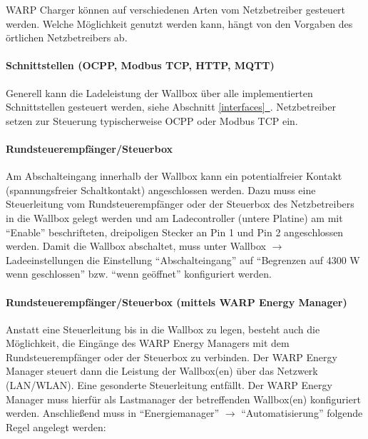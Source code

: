 \documentclass[a4paper,10pt]{article}
\newcommand*{\fullref}[1]{Abschnitt \hyperref[{#1}]{\ref*{#1}~\nameref*{#1}}}
\begin{document}
\begin{multicols*}{2}
    WARP Charger können auf verschiedenen Arten vom Netzbetreiber gesteuert werden.
    Welche Möglichkeit genutzt werden kann, hängt von den Vorgaben des örtlichen Netzbetreibers ab.

    \vspace{-0.3cm}
    \paragraph*{Schnittstellen (OCPP, Modbus TCP, HTTP, MQTT)}
    Generell kann die Ladeleistung der Wallbox über alle implementierten Schnittstellen gesteuert werden, siehe \fullref{interfaces}.
    Netzbetreiber setzen zur Steuerung typischerweise OCPP oder Modbus TCP ein.

    \vspace{-0.3cm}
    \paragraph*{Rundsteuerempfänger/Steuerbox}
    Am Abschalteingang innerhalb der Wallbox kann ein potentialfreier Kontakt (spannungsfreier Schaltkontakt)
    angeschlossen werden. Dazu muss eine Steuerleitung vom Rundsteuerempfänger
    oder der Steuerbox des Netzbetreibers in die Wallbox gelegt werden und am Ladecontroller (untere Platine)
    am mit \enquote{Enable} beschrifteten, dreipoligen Stecker an Pin 1 und Pin 2 angeschlossen werden.
    Damit die Wallbox abschaltet, muss unter Wallbox $\rightarrow$ Ladeeinstellungen die Einstellung \enquote{Abschalteingang} auf \enquote{Begrenzen auf 4300 W wenn geschlossen} bzw. \enquote{wenn geöffnet} konfiguriert werden.

    \vspace{-0.3cm}
    \paragraph*{Rundsteuerempfänger/Steuerbox (mittels WARP Energy Manager)}
    Anstatt eine Steuerleitung bis in die Wallbox zu legen, besteht auch die
    Möglichkeit, die Eingänge des WARP Energy Managers mit dem Rundsteuerempfänger oder der
    Steuerbox zu verbinden. Der WARP Energy Manager steuert dann die
    Leistung der Wallbox(en) über das Netzwerk (LAN/WLAN). Eine gesonderte
    Steuerleitung entfällt.
    Der WARP Energy Manager muss hierfür als Lastmanager der betreffenden Wallbox(en) konfiguriert werden.
    Anschließend muss in \enquote{Energiemanager} $\rightarrow$ \enquote{Automatisierung}
    folgende Regel angelegt werden:


\end{multicols*}
\end{document}
